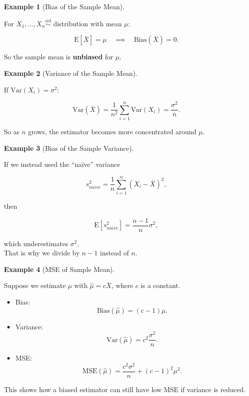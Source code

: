 \documentclass[
  letterpaper,
  DIV=11,
  numbers=noendperiod]{scrreprt}
\theoremstyle{definition}
\newtheorem{example}{Example}[chapter]
\theoremstyle{plain}
\theoremstyle{definition}
\theoremstyle{remark}
\begin{document}
\begin{example}[Bias of the Sample
Mean]\protect\hypertarget{exm-bias1}{}\label{exm-bias1}

For \(X_1,\dots,X_n \overset{iid}{\sim}\) distribution with mean
\(\mu\):

\[
\mathrm{E}[\bar{X}] = \mu
\quad\implies\quad 
\mathrm{Bias}(\bar{X}) = 0.
\]

So the sample mean is \textbf{unbiased} for \(\mu\).

\end{example}

\begin{example}[Variance of the Sample
Mean]\protect\hypertarget{exm-variance-sm}{}\label{exm-variance-sm}

If \(\mathrm{Var}(X_i) = \sigma^2\):

\[
\mathrm{Var}(\bar{X}) 
= \frac{1}{n^2} \sum_{i=1}^n \mathrm{Var}(X_i) 
= \frac{\sigma^2}{n}.
\]

So as \(n\) grows, the estimator becomes more concentrated around
\(\mu\).

\end{example}

\begin{example}[Bias of the Sample
Variance]\protect\hypertarget{exm-bias-sv}{}\label{exm-bias-sv}

If we instead used the ``naïve'' variance

\[
s^2_{naive} = \frac{1}{n}\sum_{i=1}^n (X_i - \bar{X})^2,
\]

then

\[
\mathrm{E}[s^2_{naive}] = \frac{n-1}{n}\sigma^2,
\]

which underestimates \(\sigma^2\).\\
That is why we divide by \(n-1\) instead of \(n\).

\end{example}

\begin{example}[MSE of Sample
Mean]\protect\hypertarget{exm-mse1}{}\label{exm-mse1}

Suppose we estimate \(\mu\) with \(\hat{\mu} = c\bar{X}\), where \(c\)
is a constant.

\begin{itemize}
\item
  Bias:\\
  \[
  \mathrm{Bias}(\hat{\mu}) = (c-1)\mu.
  \]
\item
  Variance:\\
  \[
  \mathrm{Var}(\hat{\mu}) = c^2 \frac{\sigma^2}{n}.
  \]
\item
  MSE:\\
  \[
  \mathrm{MSE}(\hat{\mu}) 
  = \frac{c^2\sigma^2}{n} + (c-1)^2 \mu^2.
  \]
\end{itemize}

This shows how a biased estimator can still have low MSE if variance is
reduced.

\end{example}
\end{document}
